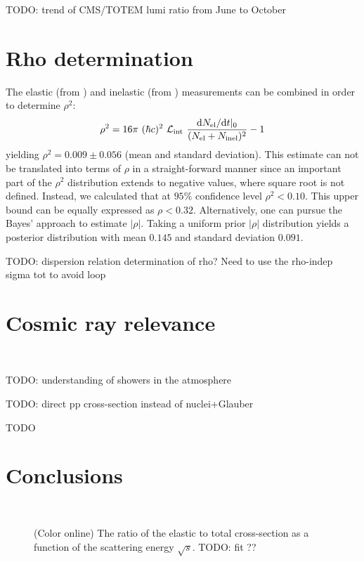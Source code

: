 \documentclass[doublecol]{../macros/epl2}
\def\d{{\rm d}}
\begin{document}
TODO: trend of CMS/TOTEM lumi ratio from June to October



\section{Rho determination}

The elastic (from \cite{P1}) and inelastic (from \cite{P2}) measurements can be combined in order to determine $\rho^2$:
\begin{equation}
\label{eq:rho}
\rho^2 = 16\pi\ (\hbar c)^2\ {\cal L_{\rm int}}\ {\d N_{\rm el}/\d t|_0\over (N_{\rm el} + N_{\rm inel})^2} - 1
\end{equation}
yielding $\rho^2 = 0.009 \pm 0.056$ (mean and standard deviation). This estimate can not be translated into terms of $\rho$ in a straight-forward manner since an important part of the $\rho^2$ distribution extends to negative values, where square root is not defined. Instead, we calculated that at $95\%$ confidence level $\rho^2 < 0.10$. This upper bound can be equally expressed as $\rho < 0.32$. Alternatively, one can pursue the Bayes' approach to estimate $|\rho|$. Taking a uniform prior $|\rho|$ distribution yields a posterior distribution with mean $0.145$ and standard deviation $0.091$.

TODO: dispersion relation determination of rho? Need to use the rho-indep sigma tot to avoid loop



\section{Cosmic ray relevance}

~

TODO: understanding of showers in the atmosphere

TODO: direct pp cross-section instead of nuclei+Glauber

TODO
	


\section{Conclusions}

~

\begin{figure}
\vskip-5mm
\caption{(Color online) The ratio of the elastic to total cross-section as a function of the scattering energy $\sqrt s$. TODO: fit ??}
\label{fig:sigma rat}
\end{figure}
\end{document}
